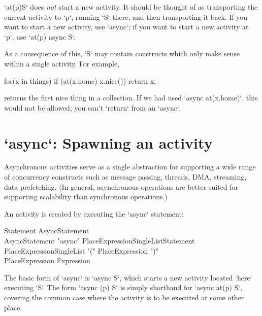 \xcd`at(p)S` does {\em not} start a new activity.  It should be thought of as
transporting the current activity to \xcd`p`, running \xcd`S` there, and then
transporting it back.    If you want to start a new activity, use \xcd`async`;
if you want to start a new activity at \xcd`p`, use 
\xcd`at(p) async S`.  




As a consequence of this, \xcd`S` may contain constructs which only make sense
within a single activity.  For example, 
\begin{xten}
  for(x in things) 
    if (at(x.home) x.nice()) 
        return x;
\end{xten}
returns the first nice thing in a collection.   If we had used 
\xcd`async at(x.home)`, this would not be allowed; 
you can't \xcd`return` from an
\xcd`async`. 



\section{\xcd`async`: Spawning an activity}\label{AsynchronousActivity}\label{AsyncActivity}

Asynchronous activities serve as a single abstraction for supporting a
wide range of concurrency constructs such as message passing, threads,
DMA, streaming, data prefetching. (In general, asynchronous operations
are better suited for supporting scalability than synchronous
operations.)

An activity is created by executing the \xcd`async` statement: 

\begin{grammar}
Statement \: AsyncStatement \\
AsyncStatement \: \xcd"async" PlaceExpressionSingleList\opt Statement \\
PlaceExpressionSingleList \: \xcd"(" PlaceExpression \xcd")" \\
PlaceExpression \: Expression 
\end{grammar} 

The basic form of \xcd`async` is \xcd`async S`, which starts a new activity
located \xcd`here` executing \xcd`S`.    The form 
\xcd`async (p) S` is simply shorthand for \xcd`async at(p) S`, covering the
common case where the activity is to be executed at some other place. 

